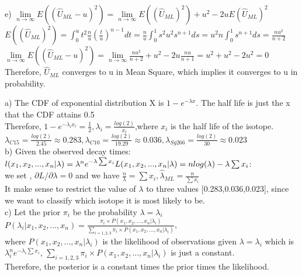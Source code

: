 \documentclass[11pt]{article}
\newenvironment{problem}[2][Problem]{\begin{trivlist}
\item[\hskip \labelsep {\bfseries #1}\hskip \labelsep {\bfseries #2.}]}{\end{trivlist}}
\begin{document}
e) $\lim\limits_{n\to \infty} E((\hat{U}_{ML} - u)^2) = \lim\limits_{n\to \infty} E((\hat{U}_{ML})^2)+u^2 -2uE(\hat{U}_{ML})^2$\\
$E((\hat{U}_{ML})^2) = \int_{0}^{u} t^2 \frac{n}{u}(\frac{t}{u})^{n-1}dt = \frac{n}{u}\int_{0}^{1} s^2u^2s^{n+1}ds = u^2n\int_{0}^{1} s^{n+1} ds = \frac{nu^2}{n+2}$\\
$\lim\limits_{n\to \infty} E((\hat{U}_{ML} - u)^2)  = \lim\limits_{n\to \infty}  \frac{nu^2}{n+2} +u^2 -2u\frac{nu}{n+1} = u^2 +u^2 - 2u^2 = 0$\\
Therefore, $\hat{U}_{ML}$ converges to u in Mean Square, which implies it converges to u in  probability.\\

\begin{problem}{2}
\end{problem}
a) The CDF of exponential distribution X is $1 - e^{-\lambda x}$. The half life is just the x that the CDF attains 0.5\\
Therefore,  $1 - e^{-\lambda_i x_i} = \frac{1}{2}, \lambda_i  = \frac{log(2)}{x_i}$,where $x_i$ is the half life of the isotope.\\
$\lambda_{C15}  = \frac{log(2)}{2.45} \approx 0.283,\lambda_{C10}  = \frac{log(2)}{19.29} \approx 0.036, \lambda_{Sg266}  = \frac{log(2)}{30} \approx 0.023$\\

b) Given the observed decay times: $l(x_1,x_2,...,x_n|\lambda) = \lambda^n e^{-\lambda \sum x_i}\\L(x_1,x_2,...,x_n|\lambda) = nlog(\lambda) -\lambda\sum x_i$:\\
 we set , $\partial L/\partial \lambda = 0$ and we have $\frac{n}{\lambda} = \sum x_i, \hat{\lambda}_{ML} = \frac{n} {\sum x_i}$\\
 It make sense to restrict the value of $\lambda$ to three values [0.283,0.036,0.023], since we want to classify which isotope it is most likely to be. \\
 
 c) Let the prior $\pi_i$ be the probability $\lambda = \lambda_i$\\
 $P(\lambda_i|x_1,x_2,...,x_n) = \frac{\pi_i \times P(x_1,x_2,...,x_n|\lambda_i)}{\sum_{i = 1,2,3}\pi_i \times P(x_1,x_2,...,x_n|\lambda_i)}$,\\ where $P(x_1,x_2,...,x_n|\lambda_i)$ is the likelihood of observations given $\lambda =\lambda_i$ which is $\lambda_i^n e^{-\lambda_i \sum x_i}$, $\sum_{i = 1,2,3}\pi_i \times P(x_1,x_2,...,x_n|\lambda_i)$ is just a constant.\\
 Therefore, the posterior is a constant times the prior times the likelihood.\\
 
\end{document}
